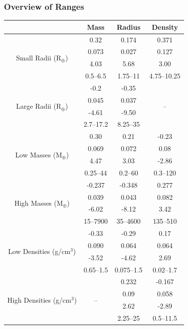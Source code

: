 \documentclass[a4paper,twocolumn,12pt]{article}
\begin{document}
\vspace{2.0em}
\subsubsection{Overview of Ranges}

\begin{table}[h!]
\begin{tabular}{ c | c | c | c }
\hline
& Mass & Radius & Density \\
\hline 
\multirow{4}{3em}{Small Radii (R$_\oplus$)}
& 0.32 & 0.174 & 0.371 \\ %
& 0.073 & 0.027 & 0.127 \\ %
& 4.03 & 5.68 & 3.00 \\ %
& 0.5--6.5 & 1.75--11 & 4.75--10.25 \\ %
\hline
\multirow{4}{3em}{Large Radii (R$_\oplus$)}
& -0.2 & -0.35 & \multirow{4}{0em}{--} \\ %
& 0.045 & 0.037 & \\ %
& -4.61 & -9.50 & \\ %
& 2.7--17.2 & 8.25--35 & \\ %
\hline
\hline
\multirow{4}{3em}{Low Masses (M$_\oplus$)}
& 0.30 & 0.21 & -0.23 \\ %
& 0.069 & 0.072 & 0.08 \\ %
& 4.47 & 3.03 & -2.86 \\ %
& 0.25--44 & 0.2--60 & 0.3--120 \\ %
\hline
\multirow{4}{3em}{High Masses (M$_\oplus$)}
& -0.237 & -0.348 & 0.277 \\ %
& 0.039 & 0.043 & 0.082 \\ %
& -6.02 & -8.12 & 3.42 \\ %
& 15--7900 & 35--4600 & 135--510 \\ %
\hline
\hline
\multirow{4}{3em}{Low Densities (g/cm$^3$)}
& -0.33 & -0.29 & 0.17 \\ %
& 0.090 & 0.064 & 0.064 \\ %
& -3.52 & -4.62 & 2.69 \\ %
& 0.65--1.5 & 0.075--1.5 & 0.02--1.7 \\ %
\hline
\multirow{4}{3em}{High Densities (g/cm$^3$)} & 
\multirow{4}{0em}{--}
 & 0.232 & -0.167\\ %
 & & 0.09 & 0.058 \\ %
 & & 2.62 & -2.89 \\ %
 & & 2.25--25 & 0.5--11.5 \\ %
 

\end{tabular}
\end{table}
\end{document}
